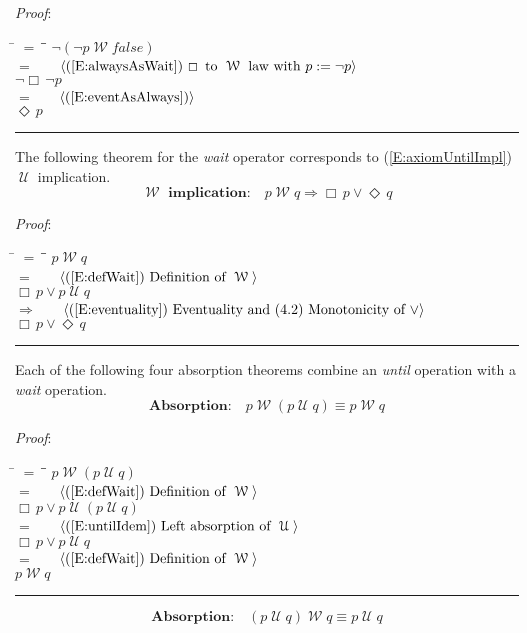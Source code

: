 \documentclass[12pt, fleqn, leqno]{article}
\newcommand{\lgap}{2pt}                             %
\newcommand{\mymathindent}{24pt}                    %
\newcommand{\impl}{\ensuremath{\Rightarrow}}        %
\newcommand{\Until}{\;\mathcal{U}\;}
\newcommand{\Wait}{\;\mathcal{W}\;}
\newcommand{\Event}{\Diamond\,}
\newcommand{\Always}{\Box\,}
\newcommand{\myqed}{\rule[-.23ex]{1.2ex}{2.0ex}}
\newcommand{\myqedtab}{\hspace{384pt}}              %
\newcommand{\Gll} {\langle}                         %
\newcommand{\Ggg} {\rangle}                         %
\newcommand{\Hint}[1]     {\ \ \ $\Gll              \mbox{#1} \Ggg$ }   %
\begin{document}
\emph{Proof}:
\begin{tabbing}
\hspace{\mymathindent} \= $= \;$ \= \myqedtab \= \kill
\> \> $\neg(\neg p \Wait false)$\\[\lgap]
\> $=$ \> \Hint{(\ref{E:alwaysAsWait}) $\Always$ to $\Wait$ law with $p := \neg p$} \\[\lgap]
\> \> $\neg\Always\neg p$\\[\lgap]
\> $=$  \>  \Hint{(\ref{E:eventAsAlways})}\\[\lgap]
\> \> $\Event p$ \quad \myqed
\end{tabbing}

The following theorem for the \textit{wait} operator corresponds to (\ref{E:axiomUntilImpl}) $\Until$ implication.
\begin{equation}\label{E:waitEntailment}
\textbf{$\Wait$ implication:}\quad p \Wait q \impl \Always p\lor \Event q
\end{equation}

\emph{Proof}:
\begin{tabbing}
\hspace{\mymathindent} \= $= \;$ \= \myqedtab \= \kill
\> \> $p \Wait q$\\[\lgap]
\> $=$ \> \Hint{(\ref{E:defWait}) Definition of $\Wait$} \\[\lgap]
\> \> $\Always p\lor p \Until q$\\[\lgap]
\> $\impl$ \> \Hint{(\ref{E:eventuality}) Eventuality and (4.2) Monotonicity of $\lor$} \\[\lgap]
\> \> $\Always p\lor \Event q$ \quad \myqed
\end{tabbing}

Each of the following four absorption theorems combine an \textit{until} operation with a \textit{wait} operation.
\begin{equation}\label{E:leftWaitAbsUtil}
\textbf{Absorption:}\quad p \Wait (p \Until q) \equiv p \Wait q
\end{equation}

\emph{Proof}:
\begin{tabbing}
\hspace{\mymathindent} \= $= \;$ \= \myqedtab \= \kill
\> \> $p \Wait (p \Until q)$\\[\lgap]
\> $=$ \> \Hint{(\ref{E:defWait}) Definition of $\Wait$} \\[\lgap]
\> \> $\Always p\lor p \Until (p \Until q)$\\[\lgap]
\> $=$ \> \Hint{(\ref{E:untilIdem}) Left absorption of $\Until$} \\[\lgap]
\> \> $\Always p\lor p \Until q$\\[\lgap]
\> $=$ \> \Hint{(\ref{E:defWait}) Definition of $\Wait$} \\[\lgap]
\> \> $p \Wait q$ \quad \myqed
\end{tabbing}
\begin{equation}\label{E:rightWaitAbsUtil}
\textbf{Absorption:}\quad (p \Until q) \Wait q \equiv p \Until q
\end{equation}
\end{document}
